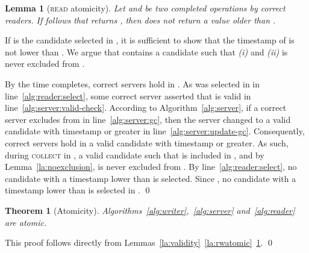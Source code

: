 \documentclass[10pt,conference,compsocconf]{IEEEtran}
\newtheorem{la}[defn]{Lemma}
\newtheorem{theo}[defn]{Theorem}
\newenvironment{prooff}{\vspace{1ex}\noindent{\bf Proof:}\hspace{0.5em}}
	{\hfill\qed\vspace{1em}}
\begin{document}
\begin{la}[\textsc{read} atomicity]\label{la:ratomic}
Let  and  be two completed  operations by correct readers. If  follows  that returns , then  does not return a value older than .
\end{la}
\begin{prooff} If  is the candidate selected in , it is sufficient to show that the timestamp of  is not lower than . We argue that
 contains a candidate  such that \textit{(i)}  and \textit{(ii)}  is never excluded from .

By the time  completes,  correct servers hold  in . As  was selected in  in line~\ref{alg:reader:select}, some correct server asserted that  is valid in line~\ref{alg:server:valid-check}. According to Algorithm~\ref{alg:server}, if a correct server excludes  from  in line~\ref{alg:server:gc}, then the server changed  to a valid candidate with timestamp  or greater in line~\ref{alg:server:update-gc}. Consequently,  correct servers hold in  a valid candidate with timestamp  or greater. As such, during \textsc{collect} in , a valid candidate  such that  is included in , and by Lemma~\ref{la:noexclusion},  is never excluded from . By line~\ref{alg:reader:select}, no candidate with a timestamp lower than  is selected. Since , no candidate with a timestamp lower than  is selected in .
\end{prooff}

\begin{theo}[Atomicity]
Algorithms~\ref{alg:writer},~\ref{alg:server} and~\ref{alg:reader} are atomic.
\end{theo}
\begin{prooff} This proof follows directly from Lemmas~\ref{la:validity}~\ref{la:rwatomic}~\ref{la:ratomic}.
\end{prooff}
\end{document}
